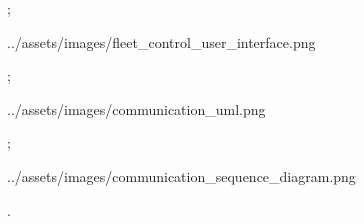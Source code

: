 
\midinsert
\endinsert

\pg;


\centerline{\picw=16cm \inspic ../assets/images/fleet_control_user_interface.png }

\pg;


\centerline{\picw=16cm \inspic ../assets/images/communication_uml.png }

\pg;


\centerline{\picw=16cm \inspic ../assets/images/communication_sequence_diagram.png }

\pg.

